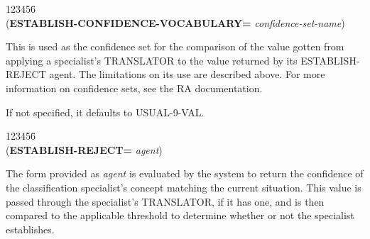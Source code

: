 \begin{tabbing}
123456\= \kill
\\
({\bf ESTABLISH-CONFIDENCE-VOCABULARY=} {\it confidence-set-name}) \\
\end{tabbing}
This is used as the confidence set for the comparison of the value gotten
from applying a specialist's TRANSLATOR to the value returned by its
ESTABLISH-REJECT agent. The limitations on its use are described
above. For more information on confidence sets, see the RA
documentation.

If not specified, it defaults to USUAL-9-VAL.



\begin{tabbing}
123456\= \kill
\\
({\bf ESTABLISH-REJECT=} {\it agent}) \\
\end{tabbing}
The form provided as {\it agent} is evaluated by the system to return
the confidence of the classification specialist's concept matching
the current situation. This value is passed through the specialist's
TRANSLATOR, if it has one, and is then compared to the applicable threshold
to determine whether or not the specialist establishes. 

